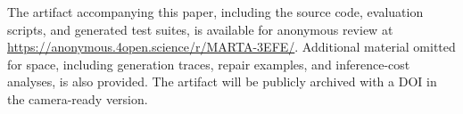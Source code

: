 \documentclass{llncs}
\begin{document}
The artifact accompanying this paper, including the source code, evaluation scripts, and generated test suites, is available for anonymous review at \url{https://anonymous.4open.science/r/MARTA-3EFE/}. Additional material omitted for space, including generation traces, repair examples, and inference-cost analyses, is also provided. The artifact will be publicly archived with a DOI in the camera-ready version.



\end{document}
